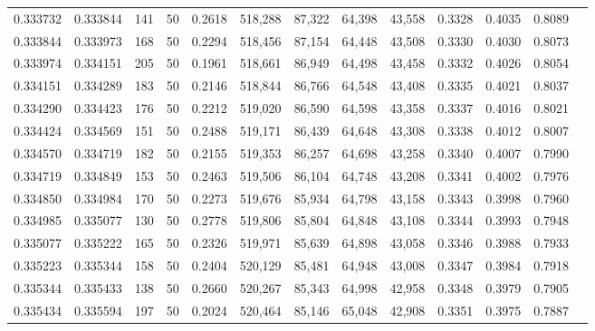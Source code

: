 \begin{tabular}{rrrrrrrrrrrrr}
0.333732 & 0.333844 &   141 &  50 &                                     0.2618 & 518,288 &  87,322 &  64,398 &  43,558 & 0.3328 & 0.4035 & 0.8089 \\
0.333844 & 0.333973 &   168 &  50 &                                     0.2294 & 518,456 &  87,154 &  64,448 &  43,508 & 0.3330 & 0.4030 & 0.8073 \\
0.333974 & 0.334151 &   205 &  50 &                                     0.1961 & 518,661 &  86,949 &  64,498 &  43,458 & 0.3332 & 0.4026 & 0.8054 \\
0.334151 & 0.334289 &   183 &  50 &                                     0.2146 & 518,844 &  86,766 &  64,548 &  43,408 & 0.3335 & 0.4021 & 0.8037 \\
0.334290 & 0.334423 &   176 &  50 &                                     0.2212 & 519,020 &  86,590 &  64,598 &  43,358 & 0.3337 & 0.4016 & 0.8021 \\
0.334424 & 0.334569 &   151 &  50 &                                     0.2488 & 519,171 &  86,439 &  64,648 &  43,308 & 0.3338 & 0.4012 & 0.8007 \\
0.334570 & 0.334719 &   182 &  50 &                                     0.2155 & 519,353 &  86,257 &  64,698 &  43,258 & 0.3340 & 0.4007 & 0.7990 \\
0.334719 & 0.334849 &   153 &  50 &                                     0.2463 & 519,506 &  86,104 &  64,748 &  43,208 & 0.3341 & 0.4002 & 0.7976 \\
0.334850 & 0.334984 &   170 &  50 &                                     0.2273 & 519,676 &  85,934 &  64,798 &  43,158 & 0.3343 & 0.3998 & 0.7960 \\
0.334985 & 0.335077 &   130 &  50 &                                     0.2778 & 519,806 &  85,804 &  64,848 &  43,108 & 0.3344 & 0.3993 & 0.7948 \\
0.335077 & 0.335222 &   165 &  50 &                                     0.2326 & 519,971 &  85,639 &  64,898 &  43,058 & 0.3346 & 0.3988 & 0.7933 \\
0.335223 & 0.335344 &   158 &  50 &                                     0.2404 & 520,129 &  85,481 &  64,948 &  43,008 & 0.3347 & 0.3984 & 0.7918 \\
0.335344 & 0.335433 &   138 &  50 &                                     0.2660 & 520,267 &  85,343 &  64,998 &  42,958 & 0.3348 & 0.3979 & 0.7905 \\
0.335434 & 0.335594 &   197 &  50 &                                     0.2024 & 520,464 &  85,146 &  65,048 &  42,908 & 0.3351 & 0.3975 & 0.7887 \\

\end{tabular}

